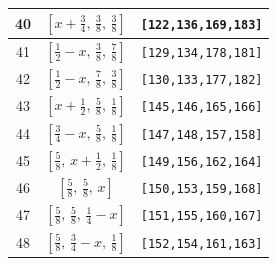 \documentclass[fleqn,8pt]{jsarticle}
\begin{document}
\begin{longtable}{ccc}
40 & $\left[ x + \frac{3}{4},\, \frac{3}{8},\, \frac{3}{8} \right]$ & {\tt [122,136,169,183]} \\ \hline
41 & $\left[ \frac{1}{2} - x,\, \frac{3}{8},\, \frac{7}{8} \right]$ & {\tt [129,134,178,181]} \\ \hline
42 & $\left[ \frac{1}{2} - x,\, \frac{7}{8},\, \frac{3}{8} \right]$ & {\tt [130,133,177,182]} \\ \hline
43 & $\left[ x + \frac{1}{2},\, \frac{5}{8},\, \frac{1}{8} \right]$ & {\tt [145,146,165,166]} \\ \hline
44 & $\left[ \frac{3}{4} - x,\, \frac{5}{8},\, \frac{1}{8} \right]$ & {\tt [147,148,157,158]} \\ \hline
45 & $\left[ \frac{5}{8},\, x + \frac{1}{2},\, \frac{1}{8} \right]$ & {\tt [149,156,162,164]} \\ \hline
46 & $\left[ \frac{5}{8},\, \frac{5}{8},\, x \right]$ & {\tt [150,153,159,168]} \\ \hline
47 & $\left[ \frac{5}{8},\, \frac{5}{8},\, \frac{1}{4} - x \right]$ & {\tt [151,155,160,167]} \\ \hline
48 & $\left[ \frac{5}{8},\, \frac{3}{4} - x,\, \frac{1}{8} \right]$ & {\tt [152,154,161,163]} \\
\end{longtable}
\renewcommand{\arraystretch}{1.2}
\end{document}
